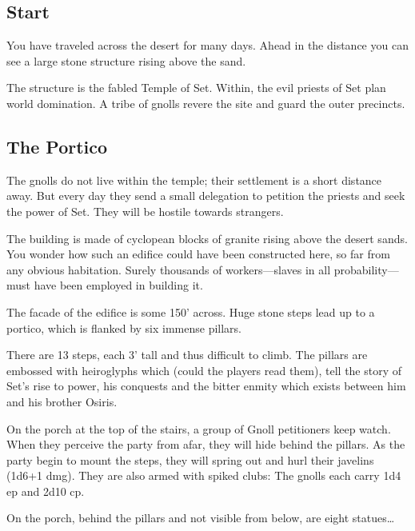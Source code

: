 \documentclass[letterpaper,serif]{module}
\begin{document}
\subsection*{Start}

\begin{boxtext}
You have traveled across the desert for many days. Ahead in the distance you can see a large stone
structure rising above the sand.
\end{boxtext}

The structure is the fabled Temple of Set. Within, the evil priests of Set plan world domination.
A tribe of gnolls revere the site and guard the outer precincts.

\subsection{The Portico} %
\label{portico}

The gnolls do not live within the temple; their settlement is a short distance away. But every day they
send a small delegation to petition the priests and seek the power of Set. They will be hostile towards
strangers.

\begin{boxtext}
The building is made of cyclopean blocks of granite rising above the desert sands. You wonder how such
an edifice could have been constructed here, so far from any obvious habitation. Surely thousands of
workers---slaves in all probability---must have been employed in building it.

The facade of the edifice is some 150' across. Huge stone steps lead up to a portico, which is flanked
by six immense pillars.
\end{boxtext}

There are 13 steps, each 3' tall and thus difficult to climb. The pillars are embossed with heiroglyphs
which (could the players read them), tell the story of Set's rise to power, his conquests and the
bitter enmity which exists between him and his brother Osiris.

On the porch at the top of the stairs, a group of Gnoll petitioners keep watch. When they perceive
the party from afar, they will hide behind the pillars. As the party begin to mount the steps, they will
spring out and hurl their javelins (1d6+1 dmg). They are also armed with spiked clubs:
The gnolls each carry 1d4 ep and 2d10 cp.

On the porch, behind the pillars and not visible from below, are eight statues\ldots
\end{document}
